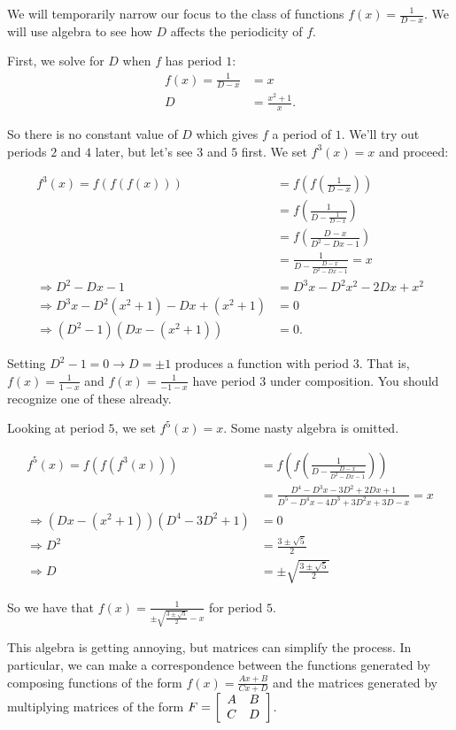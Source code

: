 \documentclass[../textbook.tex]{subfiles}
\begin{document}
\noindent We will temporarily narrow our focus to the class of functions $f(x)=\frac{1}{D-x}$. We will use algebra to see how $D$ affects the periodicity of $f$.

First, we solve for $D$ when $f$ has period $1$:
\begin{align*}
f(x)=\frac{1}{D-x}&=x \\
D&=\frac{x^2+1}{x}.
\end{align*}

\noindent So there is no constant value of $D$ which gives $f$ a period of $1$. We'll try out periods $2$ and $4$ later, but let's see $3$ and $5$ first. We set $f^3(x)=x$ and proceed:

\allowdisplaybreaks
\begin{align*}
f^3(x)=f(f(f(x)))&=f\left(f\left(\frac{1}{D-x}\right)\right) \\
&= f\left(\frac{1}{D-\frac{1}{D-x}}\right) \\
&= f\left(\frac{D-x}{D^2-Dx-1}\right) \\
&= \frac{1}{D-\frac{D-x}{D^2-Dx-1}} = x \\
\Longrightarrow D^2-Dx-1&=D^3x-D^2x^2-2Dx+x^2 \\
\Longrightarrow D^3x-D^2(x^2+1)-Dx+(x^2+1)&=0 \\
\Longrightarrow (D^2-1)(Dx-(x^2+1))&=0.
\end{align*}

\noindent Setting $D^2-1=0\rightarrow D=\pm 1$ produces a function with period $3$. That is, $f(x)=\frac{1}{1-x}$ and $f(x)=\frac{1}{-1-x}$ have period $3$ under composition. You should recognize one of these already.

Looking at period $5$, we set $f^5(x)=x$. Some nasty algebra is omitted.

\begin{align*}
f^5(x)=f(f(f^3(x)))&=f\left(f\left(\frac{1}{D-\frac{D-x}{D^2-Dx-1}}\right)\right) \\
&=\frac{D^4-D^3x-3D^2+2Dx+1}{D^5-D^4x-4D^3+3D^2x+3D-x}=x \\
\Longrightarrow (Dx-(x^2+1))(D^4-3D^2+1)&=0 \\
\Longrightarrow D^2&=\frac{3\pm\sqrt{5}}{2} \\
\Longrightarrow D &= \pm{\sqrt{\frac{3\pm\sqrt{5}}{2}}}
\end{align*}

\noindent So we have that $f(x)=\frac{1}{\pm\sqrt{\frac{3\pm\sqrt{5}}{2}}-x}$ for period $5$.

This algebra is getting annoying, but matrices can simplify the process. In particular, we can make a correspondence between the functions generated by composing functions of the form $f(x)=\frac{Ax+B}{Cx+D}$ and the matrices generated by multiplying matrices of the form $F=\left[\begin{array}{cc} A & B \\ C & D \end{array}\right]$.
\end{document}
